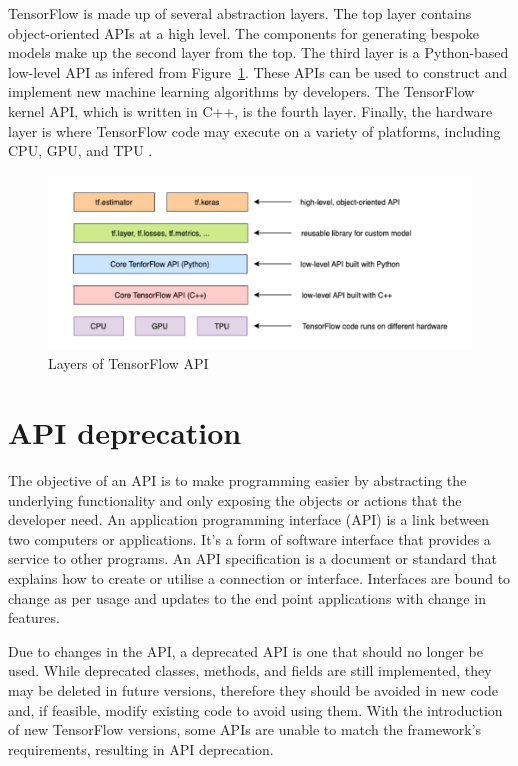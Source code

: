\documentclass[12pt,letterpaper]{report}
\begin{document}
TensorFlow is made up of several abstraction layers. The top layer contains object-oriented APIs at a high level. The components for generating bespoke models make up the second layer from the top. The third layer is a Python-based low-level API as infered from Figure~\ref{layers}.
These APIs can be used to construct and implement new machine learning algorithms by developers. The TensorFlow kernel API, which is written in C++, is the fourth layer. Finally, the hardware layer is where TensorFlow code may execute on a variety of platforms, including CPU, GPU, and TPU  \cite{apiEvo}.

\begin{figure}[h]
    \begin{center}
    \includegraphics[width=0.8 \linewidth]{comp6961-report-hierarchy.png}
    \end{center}
       \caption{Layers of TensorFlow API\cite{charsDeep}\label{layers}}
\end{figure}

\section{API deprecation} \label{sec:apidep}

The objective of an API is to make programming easier by abstracting the underlying functionality and only exposing the objects or actions that the developer need.
An application programming interface (API) is a link between two computers or applications. It's a form of software interface that provides a service to other programs. An API specification is a document or standard that explains how to create or utilise a connection or interface. Interfaces are bound to change as per usage and updates to the end point applications with change in features. 

Due to changes in the API, a deprecated API is one that should no longer be used. While deprecated classes, methods, and fields are still implemented, they may be deleted in future versions, therefore they should be avoided in new code and, if feasible, modify existing code to avoid using them. With the introduction of new TensorFlow versions, some APIs are unable to match the framework's requirements, resulting in API deprecation.
\end{document}

